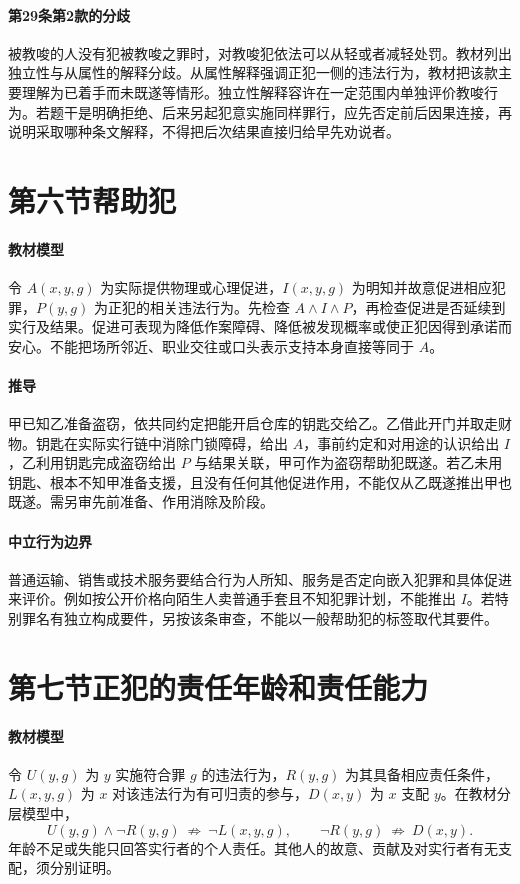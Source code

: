 \paragraph{第29条第2款的分歧}
被教唆的人没有犯被教唆之罪时，对教唆犯依法可以从轻或者减轻处罚。教材列出独立性与从属性的解释分歧。从属性解释强调正犯一侧的违法行为，教材把该款主要理解为已着手而未既遂等情形。独立性解释容许在一定范围内单独评价教唆行为。若题干是明确拒绝、后来另起犯意实施同样罪行，应先否定前后因果连接，再说明采取哪种条文解释，不得把后次结果直接归给早先劝说者。

\section{第六节\quad 帮助犯}

\paragraph{教材模型}
令 \(A(x,y,g)\) 为实际提供物理或心理促进，\(I(x,y,g)\) 为明知并故意促进相应犯罪，\(P(y,g)\) 为正犯的相关违法行为。先检查 \(A\land I\land P\)，再检查促进是否延续到实行及结果。促进可表现为降低作案障碍、降低被发现概率或使正犯因得到承诺而安心。不能把场所邻近、职业交往或口头表示支持本身直接等同于 \(A\)。

\paragraph{推导}
甲已知乙准备盗窃，依共同约定把能开启仓库的钥匙交给乙。乙借此开门并取走财物。钥匙在实际实行链中消除门锁障碍，给出 \(A\)，事前约定和对用途的认识给出 \(I\)，乙利用钥匙完成盗窃给出 \(P\) 与结果关联，甲可作为盗窃帮助犯既遂。若乙未用钥匙、根本不知甲准备支援，且没有任何其他促进作用，不能仅从乙既遂推出甲也既遂。需另审先前准备、作用消除及阶段。

\paragraph{中立行为边界}
普通运输、销售或技术服务要结合行为人所知、服务是否定向嵌入犯罪和具体促进来评价。例如按公开价格向陌生人卖普通手套且不知犯罪计划，不能推出 \(I\)。若特别罪名有独立构成要件，另按该条审查，不能以一般帮助犯的标签取代其要件。

\section{第七节\quad 正犯的责任年龄和责任能力}

\paragraph{教材模型}
令 \(U(y,g)\) 为 \(y\) 实施符合罪 \(g\) 的违法行为，\(R(y,g)\) 为其具备相应责任条件，\(L(x,y,g)\) 为 \(x\) 对该违法行为有可归责的参与，\(D(x,y)\) 为 \(x\) 支配 \(y\)。在教材分层模型中，
\[
U(y,g)\land\neg R(y,g)
\ \nRightarrow\ \neg L(x,y,g),\qquad
\neg R(y,g)\ \nRightarrow\ D(x,y).
\]
年龄不足或失能只回答实行者的个人责任。其他人的故意、贡献及对实行者有无支配，须分别证明。

